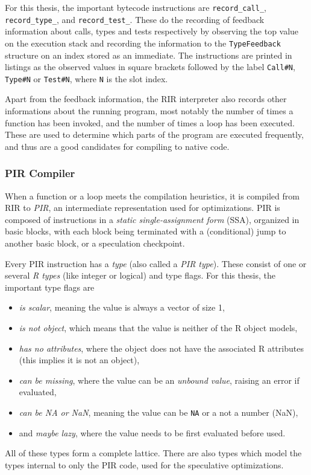 For this thesis, the important bytecode instructions are \texttt{record\_call\_}, \texttt{record\_type\_}, and \texttt{record\_test\_}. These do the recording of feedback information about calls, types and tests respectively by observing the top value on the execution stack and recording the information to the \texttt{TypeFeedback} structure on an index stored as an immediate. The instructions are printed in listings as the observed values in square brackets followed by the label \texttt{Call\#N}, \texttt{Type\#N} or \texttt{Test\#N}, where \texttt{N} is the slot index.

Apart from the feedback information, the RIR interpreter also records other informations about the running program, most notably the number of times a function has been invoked, and the number of times a loop has been executed. These are used to determine which parts of the program are executed frequently, and thus are a good candidates for compiling to native code.

\subsubsection*{PIR Compiler}

When a function or a loop meets the compilation heuristics, it is compiled from RIR to \textit{PIR}, an intermediate representation used for optimizations. PIR is composed of instructions in a \textit{static single-assignment form} (SSA), organized in basic blocks, with each block being terminated with a (conditional) jump to another basic block, or a speculation checkpoint.

Every PIR instruction has a \textit{type} (also called a \textit{PIR type}). These consist of one or several \textit{R types} (like integer or logical) and type flags. For this thesis, the important type flags are
\begin{itemize}
	\item{} \textit{is scalar}, meaning the value is always a vector of size 1,
	\item{} \textit{is not object}, which means that the value is neither of the R object models,
	\item{} \textit{has no attributes}, where the object does not have the associated R attributes (this implies it is not an object),
	\item{} \textit{can be missing}, where the value can be an \textit{unbound value}, raising an error if evaluated,
	\item{} \textit{can be NA or NaN}, meaning the value can be \texttt{NA} or a not a number (NaN),
	\item{} and \textit{maybe lazy}, where the value needs to be first evaluated before used.
\end{itemize}
All of these types form a complete lattice. There are also types which model the types internal to only the PIR code, used for the speculative optimizations.

